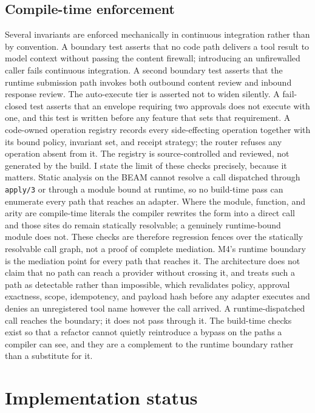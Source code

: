 \documentclass[11pt,letterpaper]{article}
\begin{document}
\subsection{Compile-time enforcement}\label{sec:beam-compile}

Several invariants are enforced mechanically in continuous integration rather than by convention. A boundary test asserts that no code path delivers a tool result to model context without passing the content firewall; introducing an unfirewalled caller fails continuous integration. A second boundary test asserts that the runtime submission path invokes both outbound content review and inbound response review. The auto-execute tier is asserted not to widen silently. A fail-closed test asserts that an envelope requiring two approvals does not execute with one, and this test is written before any feature that sets that requirement. A code-owned operation registry records every side-effecting operation together with its bound policy, invariant set, and receipt strategy; the router refuses any operation absent from it. The registry is source-controlled and reviewed, not generated by the build. I state the limit of these checks precisely, because it matters. Static analysis on the BEAM cannot resolve a call dispatched through \texttt{apply/3} or through a module bound at runtime, so no build-time pass can enumerate every path that reaches an adapter. Where the module, function, and arity are compile-time literals the compiler rewrites the form into a direct call and those sites do remain statically resolvable; a genuinely runtime-bound module does not. These checks are therefore regression fences over the statically resolvable call graph, not a proof of complete mediation. M4's runtime boundary is the mediation point for every path that reaches it. The architecture does not claim that no path can reach a provider without crossing it, and treats such a path as detectable rather than impossible, which revalidates policy, approval exactness, scope, idempotency, and payload hash before any adapter executes and denies an unregistered tool name however the call arrived. A runtime-dispatched call reaches the boundary; it does not pass through it. The build-time checks exist so that a refactor cannot quietly reintroduce a bypass on the paths a compiler can see, and they are a complement to the runtime boundary rather than a substitute for it.

\section{Implementation status}\label{sec:status}
\end{document}
